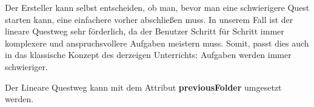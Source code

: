 Der Ersteller kann selbst entscheiden, ob man, bevor man eine schwierigere Quest starten kann, eine einfachere vorher abschließen muss. In unserem Fall ist der lineare Questweg sehr förderlich, da der Benutzer Schritt für Schritt immer komplexere und anspruchsvollere Aufgaben meistern muss. Somit, passt dies auch in das klassische Konzept des derzeigen Unterrichts: Aufgaben werden immer schwieriger.

Der Lineare Questweg kann mit dem Attribut \textbf{previousFolder} umgesetzt werden.